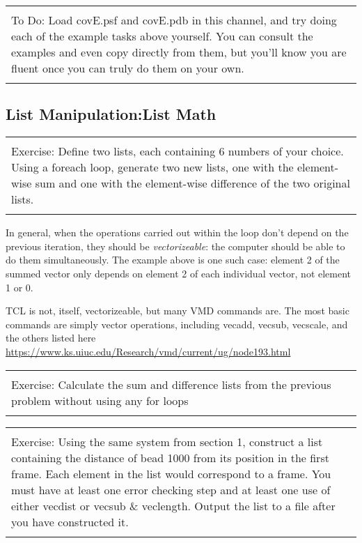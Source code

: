 \documentclass[letter,11pt]{article}
\newenvironment{exercise}
    {\begin{center}
    \begin{tabular}{|p{0.9\textwidth}|}
    \hline\\
    }
    { 
    \\\\\hline
    \end{tabular} 
    \end{center}
    }
\begin{document}
\begin{exercise}
To Do: Load covE.psf and covE.pdb in this channel, and try doing each of the example tasks above yourself. You can consult the examples and even copy directly from them, but you'll know you are fluent once you can truly do them on your own. 
\end{exercise}
\subsection{List Manipulation:List Math}
\label{subsec:listmath}
\begin{exercise}
    Exercise:  Define two lists, each containing 6 numbers of your choice. Using a foreach loop, generate two new lists, one with the element-wise sum and one with the element-wise difference of the two original lists.
\end{exercise}

%
In general, when the operations carried out within the loop don't depend on the previous iteration, they should be {\it vectorizeable}: the computer should be able to do them simultaneously.   The example above is one such case: element 2 of the summed vector only depends on element 2 of each individual vector, not element 1 or 0.  

TCL is not, itself, vectorizeable, but many VMD commands are. The most basic commands are simply vector operations,  including vecadd, vecsub, vecscale, and the others listed here \url{https://www.ks.uiuc.edu/Research/vmd/current/ug/node193.html}

    \begin{exercise}
Exercise: Calculate the sum and difference lists from the previous problem without using any for loops
\end{exercise}

    \begin{exercise}
Exercise: Using the same system from section 1, construct a list containing the distance of bead 1000 from its position in  the first frame. Each element in the list would correspond to a frame.  You must have at least one error checking step and at least one use of either vecdist or vecsub \& veclength. Output the list to a file after you have constructed it. 

	\end{exercise}
\end{document}
